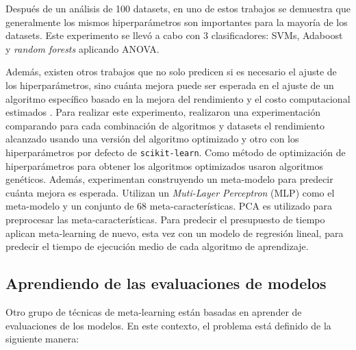 Después de un análisis de 100 datasets, en uno de estos trabajos \cite{ridd2014using} se demuestra que generalmente los mismos hiperparámetros son importantes para la mayoría de los datasets. Este experimento se llevó a cabo con 3 clasificadores: SVMs, Adaboost y \textit{random forests} aplicando ANOVA.

Además, existen otros trabajos que no solo predicen si es necesario el ajuste de los hiperparámetros, sino cuánta mejora puede ser esperada en el ajuste de un algoritmo específico basado en la mejora del rendimiento y el costo computacional estimados \cite{sanders2017informing}. Para realizar este experimento, realizaron una experimentación comparando para cada combinación de algoritmos y datasets el rendimiento alcanzado usando una versión del algoritmo optimizado y otro con los hiperparámetros por defecto de \texttt{scikit-learn}. Como método de optimización de hiperparámetros para obtener los algoritmos optimizados usaron algoritmos genéticos. Además, experimentan construyendo un meta-modelo para predecir cuánta mejora es esperada. Utilizan un \textit{Muti-Layer Perceptron} (MLP) como el meta-modelo y un conjunto de 68 meta-características. PCA es utilizado para preprocesar las meta-características. Para predecir el presupuesto de tiempo aplican meta-learning de nuevo, esta vez con un modelo de regresión lineal, para predecir el tiempo de ejecución medio de cada algoritmo de aprendizaje.


%

\subsection{Aprendiendo de las evaluaciones de modelos}\label{subsec:mtl_automl_evaluations}

Otro grupo de técnicas de meta-learning están basadas en aprender de evaluaciones de los modelos. En este contexto, el problema está definido de la siguiente manera:

